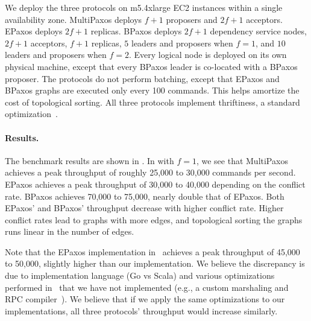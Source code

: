 We deploy the three protocols on m5.4xlarge EC2 instances within a single
availability zone. MultiPaxos deploys $f+1$ proposers and $2f+1$ acceptors.
EPaxos deploys $2f+1$ replicas. BPaxos deploys $2f+1$ dependency service nodes,
$2f+1$ acceptors, $f+1$ replicas, $5$ leaders and proposers when $f=1$, and
$10$ leaders and proposers when $f=2$. Every logical node is deployed on its
own physical machine, except that every BPaxos leader is co-located with a
BPaxos proposer. The protocols do not perform batching, except that EPaxos and
BPaxos graphs are executed only every 100 commands. This helps amortize the
cost of topological sorting. All three protocols implement thriftiness, a
standard optimization~\cite{moraru2013there}.


\paragraph{Results.}
The benchmark results are shown in . In  with
$f=1$, we see that MultiPaxos achieves a peak throughput of roughly 25,000 to
30,000 commands per second. EPaxos achieves a peak throughput of 30,000 to
40,000 depending on the conflict rate. BPaxos achieves 70,000 to 75,000,
nearly double that of EPaxos. Both EPaxos' and BPaxos' throughput decrease with
higher conflict rate. Higher conflict rates lead to graphs with more edges, and
topological sorting the graphs runs linear in the number of edges.

Note that the EPaxos implementation in~\cite{moraru2013there} achieves a peak
throughput of 45,000 to 50,000, slightly higher than our implementation. We
believe the discrepancy is due to implementation language (Go vs Scala) and
various optimizations performed in~\cite{moraru2013there} that we have not
implemented (e.g., a custom marshaling and RPC compiler~\cite{epaxos2019blog}).
We believe that if we apply the same optimizations to our implementations, all
three protocols' throughput would increase similarly.


